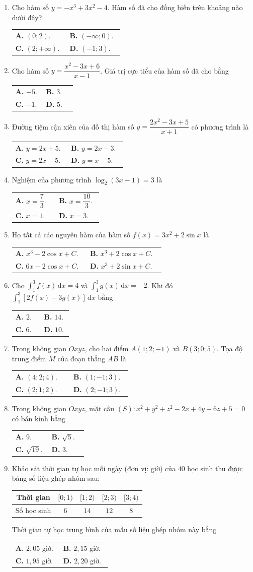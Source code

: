 \documentclass[12pt,a4paper]{article}
\makeatletter
\newcommand{\bonpa}[4]{\par\nobreak\smallskip\nobreak\noindent
\begin{tabular}{@{}p{0.47\linewidth}p{0.47\linewidth}@{}}
\textbf{A.} #1 & \textbf{B.} #2\\[8pt]
\textbf{C.} #3 & \textbf{D.} #4\end{tabular}}
\makeatother
\begin{document}
\begin{enumerate}
\item Cho hàm số $y = -x^3 + 3x^2 - 4$. Hàm số đã cho đồng biến trên khoảng nào dưới đây?
\bonpa{$(0; 2)$.}{$(-\infty; 0)$.}{$(2; +\infty)$.}{$(-1; 3)$.}

\item Cho hàm số $y = \dfrac{x^2 - 3x + 6}{x - 1}$. Giá trị cực tiểu của hàm số đã cho bằng
\bonpa{$-5$.}{$3$.}{$-1$.}{$5$.}

\item Đường tiệm cận xiên của đồ thị hàm số $y = \dfrac{2x^2 - 3x + 5}{x + 1}$ có phương trình là
\bonpa{$y = 2x + 5$.}{$y = 2x - 3$.}{$y = 2x - 5$.}{$y = x - 5$.}

\item Nghiệm của phương trình $\log_2(3x - 1) = 3$ là
\bonpa{$x = \dfrac{7}{3}$.}{$x = \dfrac{10}{3}$.}{$x = 1$.}{$x = 3$.}

\item Họ tất cả các nguyên hàm của hàm số $f(x) = 3x^2 + 2\sin x$ là
\bonpa{$x^3 - 2\cos x + C$.}{$x^3 + 2\cos x + C$.}{$6x - 2\cos x + C$.}{$x^3 + 2\sin x + C$.}

\item Cho $\displaystyle\int_1^3 f(x)\,\mathrm{d}x = 4$ và $\displaystyle\int_1^3 g(x)\,\mathrm{d}x = -2$. Khi đó $\displaystyle\int_1^3 [2f(x) - 3g(x)]\,\mathrm{d}x$ bằng
\bonpa{$2$.}{$14$.}{$6$.}{$10$.}

\item Trong không gian $Oxyz$, cho hai điểm $A(1; 2; -1)$ và $B(3; 0; 5)$. Tọa độ trung điểm $M$ của đoạn thẳng $AB$ là
\bonpa{$(4; 2; 4)$.}{$(1; -1; 3)$.}{$(2; 1; 2)$.}{$(2; -1; 3)$.}

\item Trong không gian $Oxyz$, mặt cầu $(S): x^2 + y^2 + z^2 - 2x + 4y - 6z + 5 = 0$ có bán kính bằng
\bonpa{$9$.}{$\sqrt{5}$.}{$\sqrt{19}$.}{$3$.}

\item Khảo sát thời gian tự học mỗi ngày (đơn vị: giờ) của $40$ học sinh thu được bảng số liệu ghép nhóm sau:
\begin{center}
\begin{tabular}{|c|c|c|c|c|}\hline
Thời gian & $[0; 1)$ & $[1; 2)$ & $[2; 3)$ & $[3; 4)$\\\hline
Số học sinh & $6$ & $14$ & $12$ & $8$\\\hline
\end{tabular}
\end{center}
Thời gian tự học trung bình của mẫu số liệu ghép nhóm này bằng
\bonpa{$2{,}05$ giờ.}{$2{,}15$ giờ.}{$1{,}95$ giờ.}{$2{,}20$ giờ.}


\end{enumerate}
\end{document}
